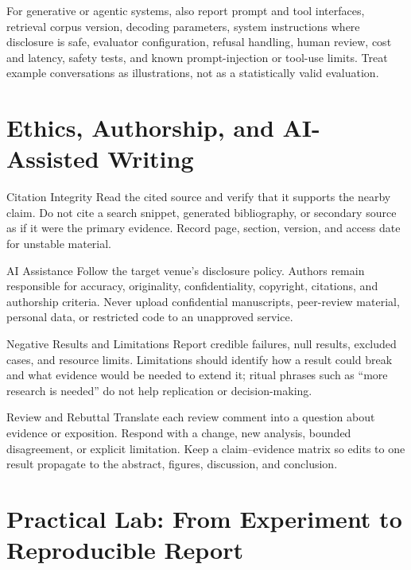 For generative or agentic systems, also report prompt and tool interfaces,
retrieval corpus version, decoding parameters, system instructions where
disclosure is safe, evaluator configuration, refusal handling, human review,
cost and latency, safety tests, and known prompt-injection or tool-use limits.
Treat example conversations as illustrations, not as a statistically valid
evaluation.

\section{Ethics, Authorship, and AI-Assisted Writing}

\begin{v3topic}{Citation Integrity}
Read the cited source and verify that it supports the nearby claim.
Do not cite a search snippet, generated bibliography, or secondary source as
if it were the primary evidence.
Record page, section, version, and access date for unstable material.

\end{v3topic}
\begin{v3topic}{AI Assistance}
Follow the target venue's disclosure policy.
Authors remain responsible for accuracy, originality, confidentiality,
copyright, citations, and authorship criteria.
Never upload confidential manuscripts, peer-review material, personal data,
or restricted code to an unapproved service.

\end{v3topic}
\begin{v3topic}{Negative Results and Limitations}
Report credible failures, null results, excluded cases, and resource limits.
Limitations should identify how a result could break and what evidence would
be needed to extend it; ritual phrases such as ``more research is needed'' do
not help replication or decision-making.

\end{v3topic}
\begin{v3topic}{Review and Rebuttal}
Translate each review comment into a question about evidence or exposition.
Respond with a change, new analysis, bounded disagreement, or explicit
limitation.
Keep a claim--evidence matrix so edits to one result propagate to the abstract,
figures, discussion, and conclusion.
\end{v3topic}

\section{Practical Lab: From Experiment to Reproducible Report}

